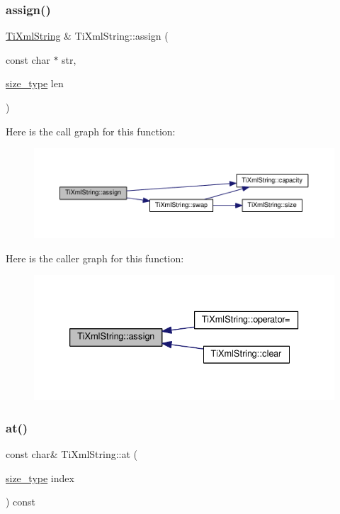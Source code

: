 \subsubsection{\texorpdfstring{assign()}{assign()}}
{\footnotesize\ttfamily \hyperlink{class_ti_xml_string}{Ti\+Xml\+String} \& Ti\+Xml\+String\+::assign (\begin{DoxyParamCaption}\item[{const char $\ast$}]{str,  }\item[{\hyperlink{class_ti_xml_string_abeb2c1893a04c17904f7c06546d0b971}{size\+\_\+type}}]{len }\end{DoxyParamCaption})}

Here is the call graph for this function\+:
\nopagebreak
\begin{figure}[H]
\begin{center}
\leavevmode
\includegraphics[width=350pt]{class_ti_xml_string_ac72f3d9149b7812c1e6c59402014d0d5_cgraph}
\end{center}
\end{figure}
Here is the caller graph for this function\+:
\nopagebreak
\begin{figure}[H]
\begin{center}
\leavevmode
\includegraphics[width=333pt]{class_ti_xml_string_ac72f3d9149b7812c1e6c59402014d0d5_icgraph}
\end{center}
\end{figure}
\mbox{\label{class_ti_xml_string_a7f33c37f7dfde5193f02521d2a7af1db}} 
\subsubsection{\texorpdfstring{at()}{at()}}
{\footnotesize\ttfamily const char\& Ti\+Xml\+String\+::at (\begin{DoxyParamCaption}\item[{\hyperlink{class_ti_xml_string_abeb2c1893a04c17904f7c06546d0b971}{size\+\_\+type}}]{index }\end{DoxyParamCaption}) const\hspace{0.3cm}{\ttfamily [inline]}}

